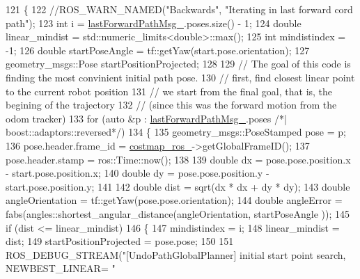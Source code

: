 \begin{DoxyCode}
121         \{
122             \textcolor{comment}{//ROS\_WARN\_NAMED("Backwards", "Iterating in last forward cord path");}
123             \textcolor{keywordtype}{int} i = \hyperlink{classcl__move__base__z_1_1undo__path__global__planner_1_1UndoPathGlobalPlanner_a9a4a6e40f5b6cb5f77dedbc5b6170871}{lastForwardPathMsg\_}.poses.size() - 1;
124             \textcolor{keywordtype}{double} linear\_mindist = std::numeric\_limits<double>::max();
125             \textcolor{keywordtype}{int} mindistindex = -1;
126             \textcolor{keywordtype}{double} startPoseAngle = tf::getYaw(start.pose.orientation);
127             geometry\_msgs::Pose startPositionProjected;
128 
129             \textcolor{comment}{// The goal of this code is finding the most convinient initial path pose.}
130             \textcolor{comment}{// first, find closest linear point to the current robot position}
131             \textcolor{comment}{// we start from the final goal, that is, the begining of the trajectory}
132             \textcolor{comment}{// (since this was the forward motion from the odom tracker)}
133             \textcolor{keywordflow}{for} (\textcolor{keyword}{auto} &p : \hyperlink{classcl__move__base__z_1_1undo__path__global__planner_1_1UndoPathGlobalPlanner_a9a4a6e40f5b6cb5f77dedbc5b6170871}{lastForwardPathMsg\_}.poses \textcolor{comment}{/*| boost::adaptors::reversed*/})
134             \{
135                 geometry\_msgs::PoseStamped pose = p;
136                 pose.header.frame\_id = \hyperlink{classcl__move__base__z_1_1undo__path__global__planner_1_1UndoPathGlobalPlanner_ab63eeb465e3ae989a6edcc4d059cf8f0}{costmap\_ros\_}->getGlobalFrameID();
137                 pose.header.stamp = ros::Time::now();
138 
139                 \textcolor{keywordtype}{double} dx = pose.pose.position.x - start.pose.position.x;
140                 \textcolor{keywordtype}{double} dy = pose.pose.position.y - start.pose.position.y;
141 
142                 \textcolor{keywordtype}{double} dist = sqrt(dx * dx + dy * dy);
143                 \textcolor{keywordtype}{double} angleOrientation = tf::getYaw(pose.pose.orientation);
144                 \textcolor{keywordtype}{double} angleError = fabs(angles::shortest\_angular\_distance(angleOrientation, startPoseAngle
      ));
145                 \textcolor{keywordflow}{if} (dist <= linear\_mindist)
146                 \{
147                     mindistindex = i;
148                     linear\_mindist = dist;
149                     startPositionProjected = pose.pose;
150 
151                     ROS\_DEBUG\_STREAM(\textcolor{stringliteral}{"[UndoPathGlobalPlanner] initial start point search, NEWBEST\_LINEAR= "}

\end{DoxyCode}
